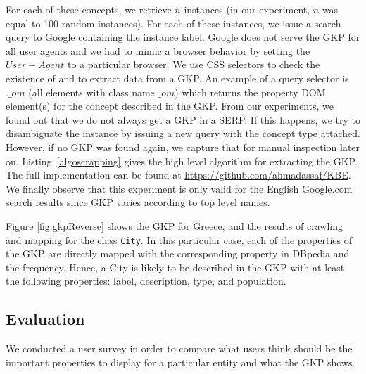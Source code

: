 For each of these concepts, we retrieve $n$ instances (in our experiment, $n$ was equal to 100 random instances). For each of these instances, we issue a search query to Google containing the instance label. Google does not serve the GKP for all user agents and we had to mimic a browser behavior by setting the $User-Agent$ to a particular browser. We use CSS selectors to check the existence of and to extract data from a GKP. An example of a query selector is $.\_om$ (all elements with class name $\_om$) which returns the property DOM element(s) for the concept described in the GKP. From our experiments, we found out that we do not always get a GKP in a SERP. If this happens, we try to disambiguate the instance by issuing a new query with the concept type attached. However, if no GKP was found again, we capture that for manual inspection later on. Listing~\ref{algoscrapping} gives the high level algorithm for extracting the GKP. The full implementation can be found at \url{https://github.com/ahmadassaf/KBE}. We finally observe that this experiment is only valid for the English Google.com search results since GKP varies according to top level names.

Figure \ref{fig:gkpReverse} shows the GKP for Greece, and the results of crawling and mapping for the class \texttt{City}. In this particular case, each of the properties of the GKP are directly mapped with the corresponding property in DBpedia and the frequency. Hence, a City is likely to be described in the GKP with at least the following properties: label, description, type, and population.


\subsection{Evaluation}
\label{sec:evaluation}
We conducted a user survey in order to compare what users think should be the important properties to display for a particular entity and what the GKP shows.

